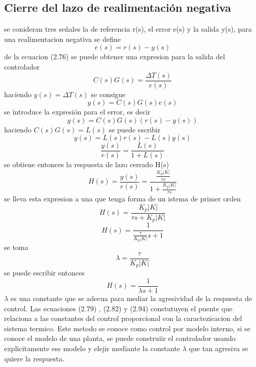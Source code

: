 \subsection{Cierre del lazo de realimentación negativa}
se conideran tres señales la de referencia r(s), el error e(s) y la salida  y(s), para una realimentacion negativa se define 
\begin{equation}
    e(s) = r(s) - y(s)
\end{equation}
de la ecuacion (2.76) se puede obtener una expresion para la salida del controlador 
\begin{equation}
    C(s)G(s)  = \frac{\Delta T(s)}{e(s)}
\end{equation}
haciendo $y(s) = \Delta T(s)$ se consigue 
\begin{equation}
    y(s)= C(s)G(s)e(s)
\end{equation}
se introduce la expresión para el error, es decir 
\begin{equation}
    y(s) = C(s)G(s)(r(s)-y(s))
\end{equation}
haciendo $C(s)G(s) = L(s)$ se puede escribir
\begin{equation}
    y(s) = L(s)r(s) - L(s)y(s)
\end{equation}
\begin{equation}
    \frac{y(s)}{r(s)} = \frac{L(s)}{1+L(s)}
\end{equation}
se obtiene entonces la respuesta de lazo cerrado H(s)
\begin{equation}
    H(s) = \frac{y(s)}{r(s)} = \frac{\frac{K_{p}|K|}{\tau s}}{1+\frac{K_{p}|K|}{\tau s}}
\end{equation}
se lleva esta expresion a una que tenga forma de un istema de primer orden 
\begin{equation}
    H(s) = \frac{K_{p}|K|}{\tau s + K_{p}|K|}
\end{equation}
\begin{equation}
    H(s) = \frac{1}{\frac{\tau}{K_{p}|K|}s + 1}
\end{equation}
  se toma 
  \begin{equation}
    \lambda = \frac{\tau}{K_{p}|K|}
  \end{equation}
   se puede escribir entonces 
   \begin{equation}
    H(s) = \frac{1}{\lambda s + 1}
   \end{equation}
   $\lambda$ es una constante que se adecua para mediar la agresividad de la respuesta de control.
   Las ecuaciones (2.79) , (2.82) y (2.94) constutuyen el puente que relaciona a las constantes del control proporcional con la caractezicacion del sistema termico.
   Este metodo se conoce como control por modelo interno, si se conoce el modelo de una planta, se puede construiir el controlador usando explicitamente ese modelo y elejir mediante la constante $\lambda$ que tan agresiva se quiere la respuesta. 
   